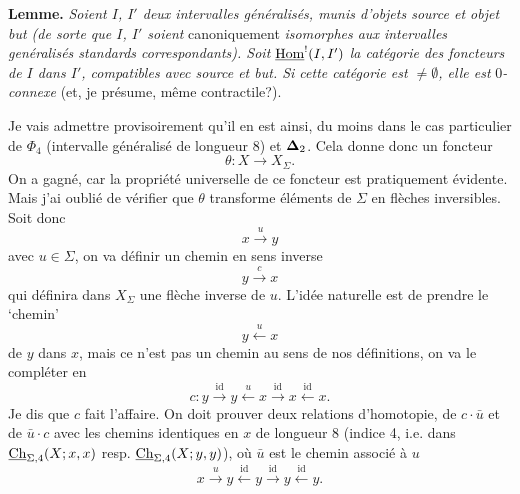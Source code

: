 \textbf{Lemme.} \textit{Soient $I$, $I'$ deux intervalles généralisés, munis d'objets source et objet but (de sorte que $I$, $I'$ soient} canoniquement \textit{isomorphes aux intervalles genéralisés standards correspondants). Soit} $\underline{\mathrm{Hom}}^!(I,I')$ %
\textit{la catégorie des foncteurs de $I$ dans $I'$, compatibles avec source et but. Si cette catégorie est $\neq \emptyset$, elle est} 0\textit{-connexe} (et, je présume, même contractile?).

Je vais admettre provisoirement qu'il en est ainsi, du moins dans le cas particulier de $\Phi_4$ (intervalle généralisé de longueur 8) et $\boldsymbol{\Delta}_2$. Cela donne donc un foncteur
\[
\theta : X \longrightarrow X_\Sigma.
\]
On a gagné, car la propriété universelle de ce foncteur est pratiquement évidente. Mais j'ai oublié de vérifier que $\theta$ transforme éléments de $\Sigma$ en flèches inversibles. Soit donc
\[
x \xrightarrow{u} y
\]
avec $u \in \Sigma$, on va définir un chemin en sens inverse
\[
y \xrightarrow{c} x
\]
qui définira dans $X_\Sigma$ une flèche inverse de $u$. L'idée naturelle est de prendre le `chemin'
\[
y \xleftarrow{u} x
\]
de $y$ dans $x$, mais ce n'est pas un chemin au sens de nos définitions, on va le compléter en
\[
c : y \xrightarrow{\mathrm{id}} y \xleftarrow{u} x \xrightarrow{\mathrm{id}} x \xleftarrow{\mathrm{id}} x.
\]
Je dis que $c$ fait l'affaire. On doit prouver deux relations d'homotopie, de $c \cdot \bar{u}$ et de $\bar{u} \cdot c$ avec les chemins identiques en $x$ de longueur 8 (indice 4, i.e. dans $\underline{\mathrm{Ch}}_{\Sigma,4}(X;x,x)$ resp. $\underline{\mathrm{Ch}}_{\Sigma,4}(X;y,y)$),
où $\bar{u}$ est le chemin associé à $u$
\[
x \xrightarrow{u} y \xleftarrow{\mathrm{id}} y \xrightarrow{\mathrm{id}} y \xleftarrow{\mathrm{id}} y.
\]

